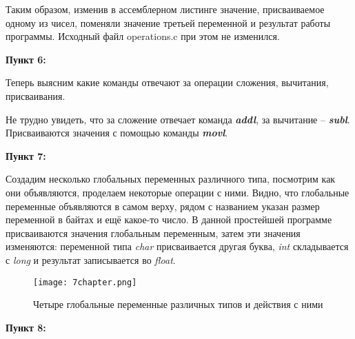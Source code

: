 \documentclass[a4paper,12pt]{article}
\begin{document}
Таким образом, изменив в ассемблерном листинге значение, присваиваемое одному из чисел, поменяли значение третьей переменной и результат работы программы. Исходный файл operations.c при этом не изменился.
\newpage

\textbf{Пункт 6:}

Теперь выясним какие команды отвечают за операции сложения, вычитания, присваивания. 

\begin{figure}[H]
    \label{fig:resul'tat slojenia C++ and C}
\end{figure}
Не трудно увидеть, что за сложение отвечает команда \textit{\textbf{addl}}, за вычитание -- \textit{\textbf{subl}}. Присваиваются значения с помощью команды \textit{\textbf{movl}}.

\textbf{Пункт 7:}

Создадим несколько глобальных переменных различного типа, посмотрим как они объявляются, проделаем некоторые операции с ними. Видно, что глобальные переменные объявляются в самом верху, рядом с названием указан размер переменной в байтах и ещё какое-то число. В данной простейшей программе присваиваются значения глобальным переменным, затем эти значения изменяются: переменной типа \textit{char} присваивается другая буква, \textit{int} складывается с \textit{long} и результат записывается во \textit{float}. 

\begin{figure}\label{fig: global vars}
    \centering
    \texttt{[image: 7chapter.png]}
    \caption*{Четыре глобальные переменные различных типов и действия с ними}
\end{figure}
\newpage

\textbf{Пункт 8:}
\end{document}
